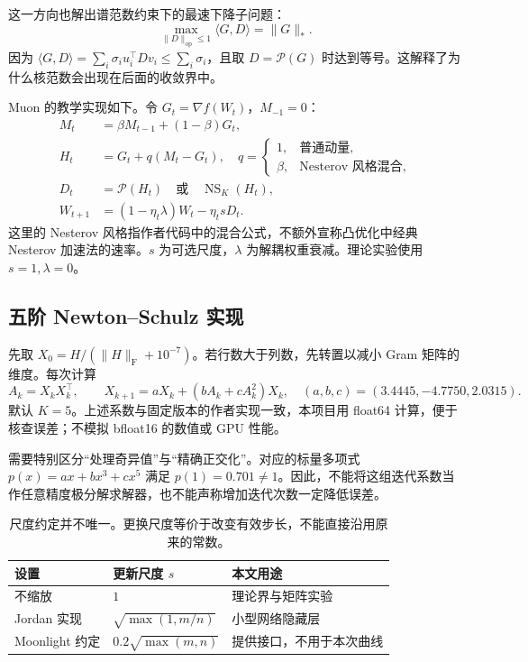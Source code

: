 \documentclass[11pt,a4paper]{article}
\theoremstyle{definition}
\newcommand{\F}{\mathrm{F}}
\newcommand{\op}{\mathrm{op}}
\newcommand{\Pol}{\mathcal{P}}
\begin{document}
这一方向也解出谱范数约束下的最速下降子问题：
\[
\max_{\|D\|_\op\le1}\langle G,D\rangle=\|G\|_*.
\]
因为 $\langle G,D\rangle=\sum_i\sigma_i u_i^\top Dv_i\le\sum_i\sigma_i$，且取 $D=\Pol(G)$ 时达到等号。这解释了为什么核范数会出现在后面的收敛界中。

Muon 的教学实现如下。令 $G_t=\nabla f(W_t)$，$M_{-1}=0$：
\begin{align}
 M_t&=\beta M_{t-1}+(1-\beta)G_t,\\
 H_t&=G_t+q(M_t-G_t),\quad
 q=\begin{cases}1,&\text{普通动量},\\\beta,&\text{Nesterov 风格混合},\end{cases}\\
 D_t&=\Pol(H_t)\quad\text{或}\quad\operatorname{NS}_K(H_t),\\
 W_{t+1}&=(1-\eta_t\lambda)W_t-\eta_t sD_t.
\end{align}
这里的 Nesterov 风格指作者代码中的混合公式，不额外宣称凸优化中经典 Nesterov 加速法的速率。$s$ 为可选尺度，$\lambda$ 为解耦权重衰减。理论实验使用 $s=1,\lambda=0$。

\subsection{五阶 Newton--Schulz 实现}
先取 $X_0=H/(\|H\|_\F+10^{-7})$。若行数大于列数，先转置以减小 Gram 矩阵的维度。每次计算
\begin{equation}
 A_k=X_kX_k^\top,\qquad
 X_{k+1}=aX_k+(bA_k+cA_k^2)X_k,
 \quad(a,b,c)=(3.4445,-4.7750,2.0315).
\end{equation}
默认 $K=5$。上述系数与固定版本的作者实现一致\cite{code}，本项目用 float64 计算，便于核查误差；不模拟 bfloat16 的数值或 GPU 性能。

需要特别区分“处理奇异值”与“精确正交化”。对应的标量多项式
$p(x)=ax+bx^3+cx^5$ 满足 $p(1)=0.701\ne1$。因此，不能将这组迭代系数当作任意精度极分解求解器，也不能声称增加迭代次数一定降低误差。

\begin{table}[H]
\centering\small
\begin{tabular}{lll}
\toprule
设置 & 更新尺度 $s$ & 本文用途\\\midrule
不缩放 & $1$ & 理论界与矩阵实验\\
Jordan 实现 & $\sqrt{\max(1,m/n)}$ & 小型网络隐藏层\\
Moonlight 约定 & $0.2\sqrt{\max(m,n)}$ & 提供接口，不用于本次曲线\\
\bottomrule
\end{tabular}
\caption{尺度约定并不唯一。更换尺度等价于改变有效步长，不能直接沿用原来的常数。}
\end{table}
\end{document}
